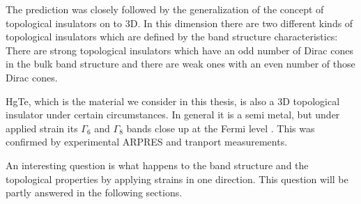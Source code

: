 	The prediction was closely followed by the generalization of the concept of topological insulators on to 3D. 
	In this dimension there are two different kinds of topological insulators which are defined by the band structure characteristics: There are strong topological insulators which have an odd number of Dirac cones in the bulk band structure and there are weak ones with an even number of those Dirac cones. 
	
	HgTe, which is the material we consider in this thesis, is also a 3D topological insulator under certain circumstances. In general it is a semi metal, but under applied strain its $\Gamma_6$ and $\Gamma_8$ bands close up at the Fermi level \cite{textbook_ti}. This was confirmed by experimental ARPRES and tranport measurements.
	
	An interesting question is what happens to the band structure and the topological properties by applying strains in one direction. This question will be partly answered in the following sections.
%
%	
%	

